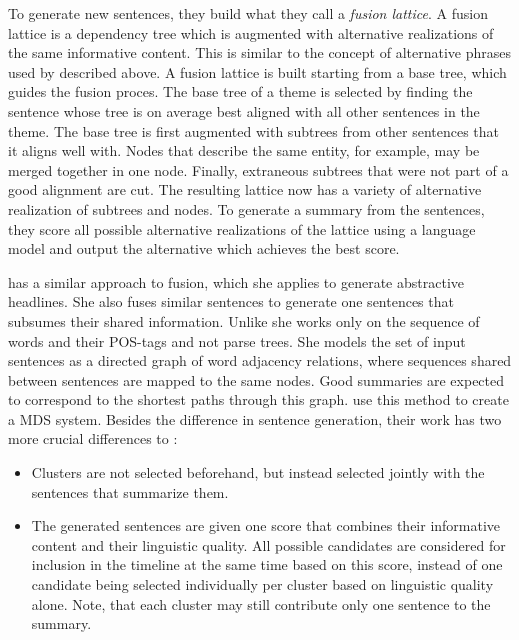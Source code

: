 \documentclass[a4paper,BCOR=10mm]{report}
\numberwithin{lemma}{chapter}
\numberwithin{definition}{chapter}
\begin{document}
To generate new sentences, they build what they call a \textit{fusion lattice}. A fusion lattice is a dependency tree which is augmented with alternative realizations of the same informative content. This is similar to the concept of alternative phrases used by \citet{bing} described above.
A fusion lattice is built starting from a base tree, which guides the fusion proces. The base tree of a theme is selected by finding the sentence whose tree is on average best aligned with all other sentences in the theme.
The base tree is first augmented with subtrees from other sentences that it aligns well with. Nodes that describe the same entity, for example, may be merged together in one node. Finally, extraneous subtrees that were not part of a good alignment are cut.
The resulting lattice now has a variety of alternative realization of subtrees and nodes.
To generate a summary from the sentences, they score all possible alternative realizations of the lattice using a language model and output the alternative which achieves the best score.

\citet{filippova} has a similar approach to fusion, which she applies to generate abstractive headlines. She also fuses similar sentences to generate one sentences that subsumes their shared information. Unlike \citet{barzilay+mckeown} she works only on the sequence of words and their POS-tags and not parse trees. She models the set of input sentences as a directed graph of word adjacency relations, where sequences shared between sentences are mapped to the same nodes. Good summaries are expected to correspond to the shortest paths through this graph.
\citet{banerjee} use this method to create a MDS system. Besides the difference in sentence generation, their work has two more crucial differences to \citeauthor{barzilay+mckeown}:

\begin{itemize}
    \item{Clusters are not selected beforehand, but instead selected jointly with the sentences that summarize them.}
    \item{The generated sentences are given one score that combines their informative content and their linguistic quality. All possible candidates are considered for inclusion in the timeline at the same time based on this score, instead of one candidate being selected individually per cluster based on linguistic quality alone. Note, that each cluster may still contribute only one sentence to the summary.}
\end{itemize}
\end{document}
